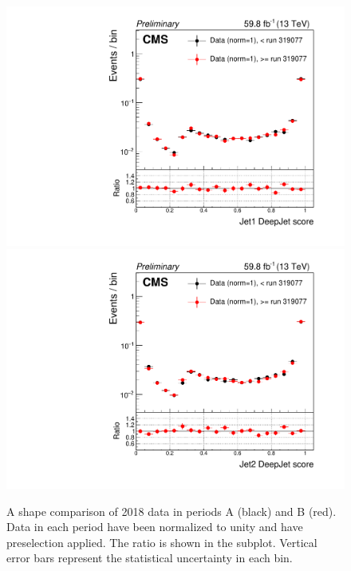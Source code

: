 \begin{figure}[H]
    \centering
    {\includegraphics[width=.49\textwidth]{Images/Analysis/Results_HEMFailureStudyPlots_Data_BeforeAfterRun319077/BasicLQ_uujj_DeepJet_jet1_standard.pdf}}
    {\includegraphics[width=.49\textwidth]{Images/Analysis/Results_HEMFailureStudyPlots_Data_BeforeAfterRun319077/BasicLQ_uujj_DeepJet_jet2_standard.pdf}}
    \caption{A shape comparison of 2018 data in periods A (black) and B (red). Data in each period have been normalized to unity and have preselection applied. The ratio \RatioDataAB is shown in the subplot. Vertical error bars represent the statistical uncertainty in each bin.}
    \label{figapp:hembtagscores}
\end{figure}


